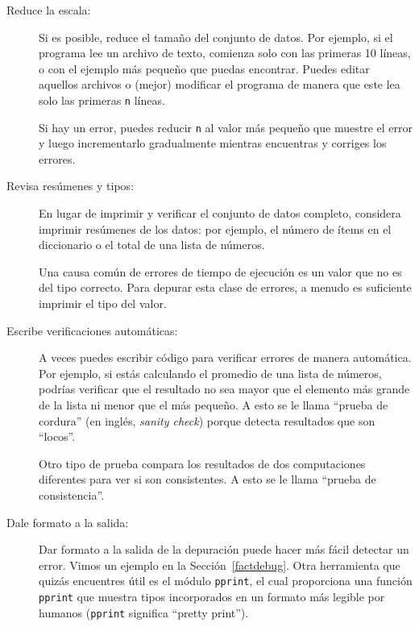 \documentclass[10pt]{book}
\begin{document}
\begin{description}

\item[Reduce la escala:] Si es posible, reduce el tamaño del
conjunto de datos.  Por ejemplo, si el programa lee un archivo de texto, comienza 
solo con las primeras 10 líneas, o con el ejemplo más pequeño que puedas encontrar.
Puedes editar aquellos archivos o (mejor) modificar el
programa de manera que este lea solo las primeras {\tt n} líneas.

Si hay un error, puedes reducir {\tt n} al valor más pequeño
que muestre el error y luego incrementarlo gradualmente
mientras encuentras y corriges los errores.

\item[Revisa resúmenes y tipos:] En lugar de imprimir y verificar el conjunto
de datos completo, considera imprimir resúmenes de los datos: por ejemplo,
el número de ítems en el diccionario o el total de una lista de números.

Una causa común de errores de tiempo de ejecución es un valor que no es del tipo
correcto.  Para depurar esta clase de errores, a menudo es suficiente imprimir
el tipo del valor.

\item[Escribe verificaciones automáticas:]  A veces puedes escribir código para verificar
errores de manera automática. Por ejemplo, si estás calculando el
promedio de una lista de números, podrías verificar que el resultado no
sea mayor que el elemento más grande de la lista ni menor que
el más pequeño. A esto se le llama ``prueba de cordura'' (en inglés, {\em sanity check})
porque detecta resultados que son ``locos''.

Otro tipo de prueba compara los resultados de dos computaciones
diferentes para ver si son consistentes. A esto se le llama
``prueba de consistencia''.

\item[Dale formato a la salida:] Dar formato a la salida de la depuración
puede hacer más fácil detectar un error.  Vimos un ejemplo en la 
Sección~\ref{factdebug}.  Otra herramienta que quizás encuentres útil es el módulo {\tt pprint},
el cual proporciona una función {\tt pprint} que muestra tipos incorporados en
un formato más legible por humanos ({\tt pprint} significa
``pretty print'').

\end{description}
\end{document}
